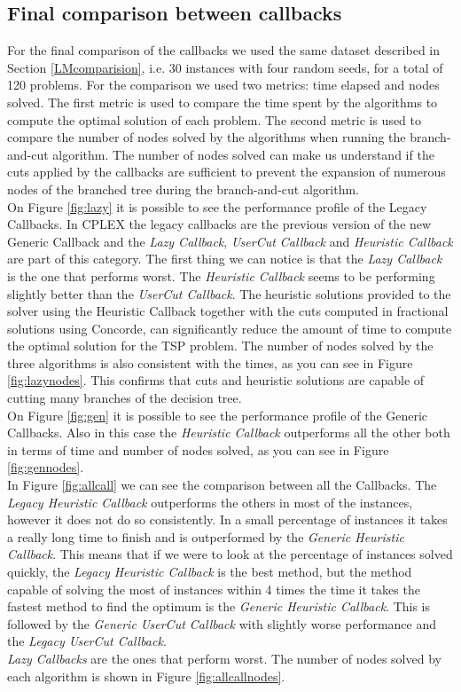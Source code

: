 \subsection{Final comparison between callbacks}
\label{callbackresults}
For the final comparison of the callbacks we used the same dataset described in Section \ref{LMcomparision}, i.e. 30 instances with four random seeds, for a total of 120 problems.
For the comparison we used two metrics: time elapsed and nodes solved. The first metric is used to compare the time spent by the algorithms to compute the optimal solution of each problem. The second metric is used to compare the number of nodes solved by the algorithms when running the branch-and-cut algorithm. The number of nodes solved can make us understand if the cuts applied by the callbacks are sufficient to prevent the expansion of numerous nodes of the branched tree during the branch-and-cut algorithm. \\
On Figure \ref{fig:lazy} it is possible to see the performance profile of the Legacy Callbacks. In CPLEX the legacy callbacks are the previous version of the new Generic Callback and the \textit{Lazy Callback}, \textit{UserCut Callback} and \textit{Heuristic Callback} are part of this category. The first thing we can notice is that the \textit{Lazy Callback} is the one that performs worst. The \textit{Heuristic Callback} seems to be performing slightly better than the \textit{UserCut Callback}. The heuristic solutions provided to the solver using the Heuristic Callback together with the cuts computed in fractional solutions using Concorde, can significantly reduce the amount of time to compute the optimal solution for the TSP problem. The number of nodes solved by the three algorithms is also consistent with the times, as you can see in Figure \ref{fig:lazynodes}. This confirms that cuts and heuristic solutions are capable of cutting many branches of the decision tree. \\
On Figure \ref{fig:gen} it is possible to see the performance profile of the Generic Callbacks. Also in this case the \textit{Heuristic Callback} outperforms all the other both in terms of time and number of nodes solved, as you can see in Figure \ref{fig:gennodes}. \\
In Figure \ref{fig:allcall} we can see the comparison between all the Callbacks. The \textit{Legacy Heuristic Callback} outperforms the others in most of the instances, however it does not do so consistently. In a small percentage of instances it takes a really long time to finish and is outperformed by the \textit{Generic Heuristic Callback}. This means that if we were to look at the percentage of instances solved quickly, the \textit{Legacy Heuristic Callback} is the best method, but the method capable of solving the most of instances within 4 times the time it takes the fastest method to find the optimum is the \textit{Generic Heuristic Callback}. This is followed by the \textit{Generic UserCut Callback} with slightly worse performance and the \textit{Legacy UserCut Callback}.\\ \textit{Lazy Callbacks} are the ones that perform worst. The number of nodes solved by each algorithm is shown in Figure \ref{fig:allcallnodes}. \\
